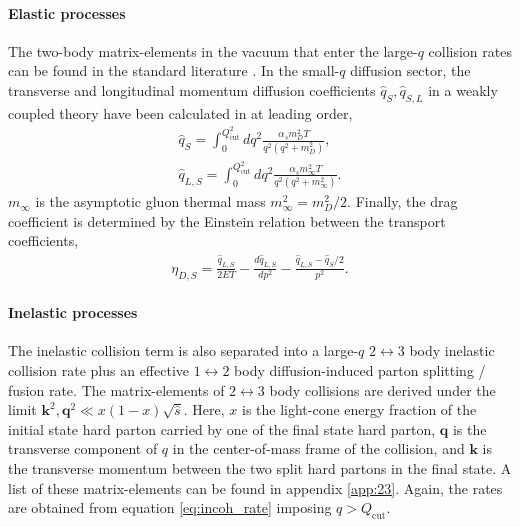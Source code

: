 \documentclass[aps, prc, reprint, amsmath, groupedaddress, nofootinbib]{revtex4-1}
\begin{document}
\paragraph{Elastic processes} The two-body matrix-elements in the vacuum that enter the large-$q$ collision rates can be found in the standard literature \cite{RevModPhys.59.465}.
In the small-$q$ diffusion sector, the transverse and longitudinal momentum diffusion coefficients $\hat{q}_S, \hat{q}_{S,L}$ in a weakly coupled theory have been calculated in \cite{Ghiglieri:2015ala} at leading order,
\begin{eqnarray}
\hat{q}_S = \int_0^{Q_{\textrm{cut}}^2} dq^2 \frac{\alpha_s m_D^2 T}{q^2 (q^2+m_D^2)},
\label{eq:qS} \\
\hat{q}_{L,S} = \int_0^{Q_{\textrm{cut}}^2} dq^2 \frac{\alpha_s m_\infty^2 T}{q^2 (q^2+m_\infty^2)}.
\label{eq:qSL}
\end{eqnarray}
$m_{\infty}$ is the asymptotic gluon thermal mass $m_{\infty}^2 = m_D^2/2$.
Finally, the drag coefficient is determined by the Einstein relation between the transport coefficients,
\begin{eqnarray}
\eta_{D,S} = \frac{\hat{q}_{L,S}}{2ET} - \frac{d\hat{q}_{L,S}}{dp^2} - \frac{\hat{q}_{L,S} - \hat{q}_S/2}{p^2}.
\end{eqnarray}

\paragraph{Inelastic processes} The inelastic collision term is also separated into a large-$q$ $2\leftrightarrow 3$ body inelastic collision rate plus an effective $1\leftrightarrow 2$ body diffusion-induced parton splitting / fusion rate.
The matrix-elements of $2\leftrightarrow 3$ body collisions are derived under the limit $\mathbf{k}^2, \mathbf{q}^2 \ll x(1-x)\sqrt{\hat{s}}$.
Here, $x$ is the light-cone energy fraction of the initial state hard parton carried by one of the final state hard parton, $\mathbf{q}$ is the transverse component of $q$ in the center-of-mass frame of the collision, and $\mathbf{k}$ is the transverse momentum between the two split hard partons in the final state. 
A list of these matrix-elements can be found in appendix \ref{app:23}.
Again, the rates are obtained from equation \ref{eq:incoh_rate} imposing $q>Q_{\textrm{cut}}$.
\end{document}
